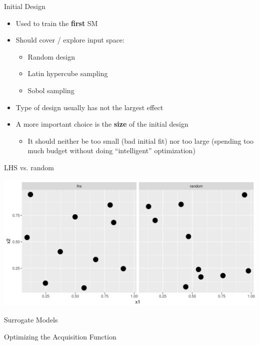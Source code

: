 \documentclass[11pt,compress,t,notes=noshow, xcolor=table]{beamer}
\begin{document}
\begin{vbframe}{Initial Design}

\begin{itemize}
\item Used to train the \textbf{first} SM
\item Should cover / explore input space:
\begin{itemize}
  \item Random design
  \item Latin hypercube sampling
  \item Sobol sampling
\end{itemize}
\item Type of design usually has not the largest effect
\item A more important choice is the \textbf{size} of the initial design
\begin{itemize}
  \item It should neither be too small (bad initial fit) nor too large (spending too much budget without doing \enquote{intelligent} optimization)
\end{itemize}
\end{itemize}

\framebreak

LHS vs. random

\begin{center}
\includegraphics[width=\textwidth]{figure_man/initdes.png}  %
\end{center}

\end{vbframe}

\begin{vbframe}{Surrogate Models}

\end{vbframe}

\begin{vbframe}{Optimizing the Acquisition Function}

\end{vbframe}

\endlecture
\end{document}
